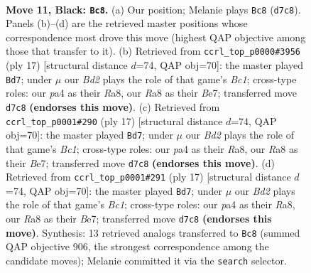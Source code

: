 \documentclass[11pt]{article}
\begin{document}
\clearpage

\begin{figure}[p]\centering
\begin{subfigure}{0.46\textwidth}\centering
\resizebox{\linewidth}{!}{%
\newchessgame
\chessboard[
  setfen={r2q1rk1/2pbbppp/p1np1n2/4p1N1/Pp2P3/1B1P1Q2/1PP2PPP/RNB1R1K1 b - - 0 11},
  showmover=false,
  pgfstyle=straightmove, color=movearrow, markmove={d7-c8}
]}
\caption{}
\end{subfigure}\hfill
\begin{subfigure}{0.46\textwidth}\centering
\resizebox{\linewidth}{!}{%
\newchessgame
\chessboard[
  setfen={r1bq1rk1/2p1bppp/p1np1n2/1p2p3/P3P3/1B1P1N2/1PP2PPP/RNBQR1K1 b - - 0 9},
  showmover=false,
  pgfstyle=straightmove, color=movearrow, markmove={c8-d7}
]}
\caption{}
\end{subfigure}
\\[4pt]
\begin{subfigure}{0.46\textwidth}\centering
\resizebox{\linewidth}{!}{%
\newchessgame
\chessboard[
  setfen={r1bq1rk1/2p1bppp/p1np1n2/1p2p3/P3P3/1B1P1N2/1PP2PPP/RNBQR1K1 b - - 0 9},
  showmover=false,
  pgfstyle=straightmove, color=movearrow, markmove={c8-d7}
]}
\caption{}
\end{subfigure}\hfill
\begin{subfigure}{0.46\textwidth}\centering
\resizebox{\linewidth}{!}{%
\newchessgame
\chessboard[
  setfen={r1bq1rk1/2p1bppp/p1np1n2/1p2p3/P3P3/1B1P1N2/1PP2PPP/RNBQR1K1 b - - 0 9},
  showmover=false,
  pgfstyle=straightmove, color=movearrow, markmove={c8-d7}
]}
\caption{}
\end{subfigure}
\caption{\textbf{Move 11, Black: \texttt{Bc8}.} (a) Our position; Melanie plays \texttt{Bc8} (\texttt{d7c8}). Panels (b)--(d) are the retrieved master positions whose correspondence most drove this move (highest QAP objective among those that transfer to it). (b) Retrieved from \texttt{ccrl\_top\_p0000\#3956} (ply 17) [structural distance $d$=74, QAP obj=70]: the master played \texttt{Bd7}; under $\mu$ our \emph{Bd2} plays the role of that game's \emph{Bc1}; cross-type roles: our \emph{p}a4 as their \emph{R}a8, our \emph{R}a8 as their \emph{B}e7; transferred move \texttt{d7c8} \textbf{(endorses this move)}. (c) Retrieved from \texttt{ccrl\_top\_p0001\#290} (ply 17) [structural distance $d$=74, QAP obj=70]: the master played \texttt{Bd7}; under $\mu$ our \emph{Bd2} plays the role of that game's \emph{Bc1}; cross-type roles: our \emph{p}a4 as their \emph{R}a8, our \emph{R}a8 as their \emph{B}e7; transferred move \texttt{d7c8} \textbf{(endorses this move)}. (d) Retrieved from \texttt{ccrl\_top\_p0001\#291} (ply 17) [structural distance $d$=74, QAP obj=70]: the master played \texttt{Bd7}; under $\mu$ our \emph{Bd2} plays the role of that game's \emph{Bc1}; cross-type roles: our \emph{p}a4 as their \emph{R}a8, our \emph{R}a8 as their \emph{B}e7; transferred move \texttt{d7c8} \textbf{(endorses this move)}. Synthesis: 13 retrieved analogs transferred to \texttt{Bc8} (summed QAP objective 906, the strongest correspondence among the candidate moves); Melanie committed it via the \texttt{search} selector.}
\label{fig:thought-m21}
\end{figure}
\end{document}
